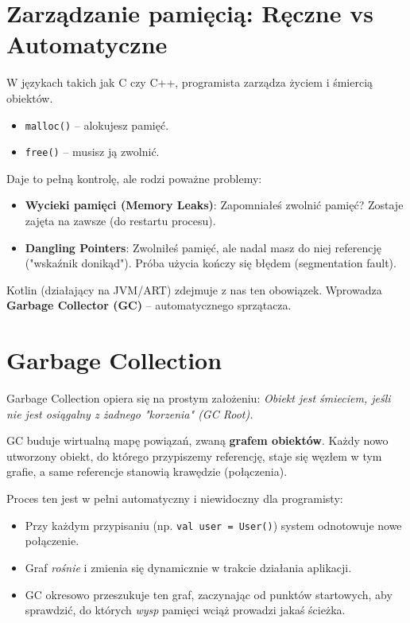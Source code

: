 \section{Zarządzanie pamięcią: Ręczne vs Automatyczne}

W językach takich jak C czy C++, programista zarządza życiem i śmiercią obiektów.
\begin{itemize}
    \item \texttt{malloc()} – alokujesz pamięć.
    \item \texttt{free()} – musisz ją zwolnić.
\end{itemize}

Daje to pełną kontrolę, ale rodzi poważne problemy:
\begin{itemize}
    \item \textbf{Wycieki pamięci (Memory Leaks)}: Zapomniałeś zwolnić pamięć? Zostaje zajęta na zawsze (do restartu procesu).
    \item \textbf{Dangling Pointers}: Zwolniłeś pamięć, ale nadal masz do niej referencję ("wskaźnik donikąd"). Próba użycia kończy się błędem (segmentation fault).
\end{itemize}

Kotlin (działający na JVM/ART) zdejmuje z nas ten obowiązek. Wprowadza \textbf{Garbage Collector (GC)} – automatycznego sprzątacza.

\section{Garbage Collection}

Garbage Collection opiera się na prostym założeniu: \textit{Obiekt jest śmieciem, jeśli nie jest osiągalny z żadnego "korzenia" (GC Root).}

GC buduje wirtualną mapę powiązań, zwaną \textbf{grafem obiektów}. Każdy nowo utworzony obiekt, do którego przypiszemy referencję, staje się węzłem w tym grafie, a same referencje stanowią krawędzie (połączenia). 

Proces ten jest w pełni automatyczny i niewidoczny dla programisty:
\begin{itemize}
    \item Przy każdym przypisaniu (np. \texttt{val user = User()}) system odnotowuje nowe połączenie.
    \item Graf \textit{rośnie} i zmienia się dynamicznie w trakcie działania aplikacji.
    \item GC okresowo przeszukuje ten graf, zaczynając od punktów startowych, aby sprawdzić, do których \textit{wysp} pamięci wciąż prowadzi jakaś ścieżka.
\end{itemize}


